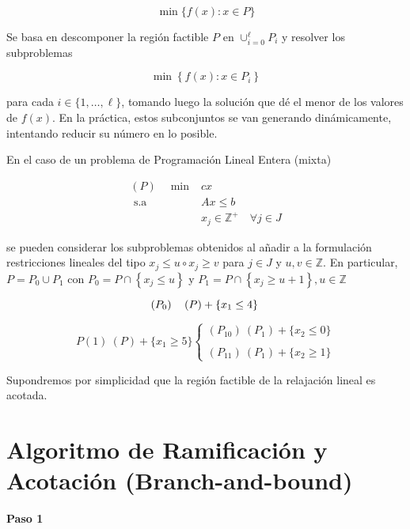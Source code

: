 \documentclass[openany]{book}
\begin{document}
$$
\min \{f(x): x \in P\}
$$

Se basa en descomponer la región factible $P$ en $\cup_{i=0}^{\ell} P_{i}$ y resolver los subproblemas

$$
\min \left\{f(x): x \in P_{i}\right\}
$$

para cada $i \in\{1, \ldots, \ell\}$, tomando luego la solución que dé el menor de los valores de $f(x)$. En la práctica, estos subconjuntos se van generando dinámicamente, intentando reducir su número en lo posible.

En el caso de un problema de Programación Lineal Entera (mixta)

$$
\begin{aligned}
(P) \quad \min & c x \\
\text { s.a } & A x \leq b \\
& x_{j} \in \mathbb{Z}^{+} \quad \forall j \in J
\end{aligned}
$$

se pueden considerar los subproblemas obtenidos al añadir a la formulación restricciones lineales del tipo $x_{j} \leq u \circ x_{j} \geq v$ para $j \in J$ y $u, v \in \mathbb{Z} .$ En particular, $P=P_{0} \cup P_{1}$ con $P_{0}=P \cap\left\{x_{j} \leq u\right\}$ y $P_{1}=P \cap\left\{x_{j} \geq u+1\right\}, u \in \mathbb{Z}$

\begin{example}

  $$
\left(P_{0}\right) \quad(P)+\left\{x_{1} \leq 4\right\} \\
$$

$$
P(1)\ (P) + \{x_1 \geq 5\} \left\{ \begin{array}{l}
  (P_{10})\ (P_1)+\{x_2 \leq 0\}\\
  \\
  (P_{11})\ (P_1) + \{x_2 \geq 1\}
\end{array} \right.
$$


\end{example}


Supondremos por simplicidad que la región factible de la relajación lineal es acotada.

\section{Algoritmo de Ramificación y Acotación (Branch-and-bound)}

\begin{center}
\textbf{Paso 1}
\end{center}
\end{document}
